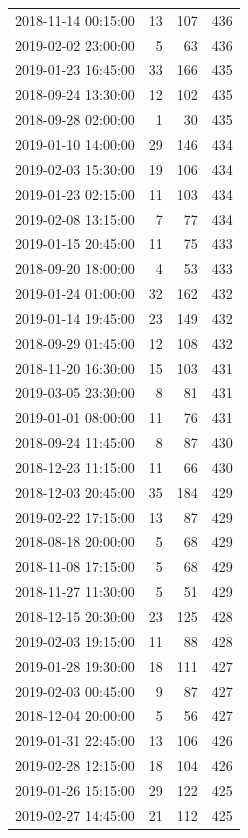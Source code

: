 \begin{tabular}{lrrr}
2018-11-14 00:15:00 & 13 & 107 & 436 \\
2019-02-02 23:00:00 & 5 & 63 & 436 \\
2019-01-23 16:45:00 & 33 & 166 & 435 \\
2018-09-24 13:30:00 & 12 & 102 & 435 \\
2018-09-28 02:00:00 & 1 & 30 & 435 \\
2019-01-10 14:00:00 & 29 & 146 & 434 \\
2019-02-03 15:30:00 & 19 & 106 & 434 \\
2019-01-23 02:15:00 & 11 & 103 & 434 \\
2019-02-08 13:15:00 & 7 & 77 & 434 \\
2019-01-15 20:45:00 & 11 & 75 & 433 \\
2018-09-20 18:00:00 & 4 & 53 & 433 \\
2019-01-24 01:00:00 & 32 & 162 & 432 \\
2019-01-14 19:45:00 & 23 & 149 & 432 \\
2018-09-29 01:45:00 & 12 & 108 & 432 \\
2018-11-20 16:30:00 & 15 & 103 & 431 \\
2019-03-05 23:30:00 & 8 & 81 & 431 \\
2019-01-01 08:00:00 & 11 & 76 & 431 \\
2018-09-24 11:45:00 & 8 & 87 & 430 \\
2018-12-23 11:15:00 & 11 & 66 & 430 \\
2018-12-03 20:45:00 & 35 & 184 & 429 \\
2019-02-22 17:15:00 & 13 & 87 & 429 \\
2018-08-18 20:00:00 & 5 & 68 & 429 \\
2018-11-08 17:15:00 & 5 & 68 & 429 \\
2018-11-27 11:30:00 & 5 & 51 & 429 \\
2018-12-15 20:30:00 & 23 & 125 & 428 \\
2019-02-03 19:15:00 & 11 & 88 & 428 \\
2019-01-28 19:30:00 & 18 & 111 & 427 \\
2019-02-03 00:45:00 & 9 & 87 & 427 \\
2018-12-04 20:00:00 & 5 & 56 & 427 \\
2019-01-31 22:45:00 & 13 & 106 & 426 \\
2019-02-28 12:15:00 & 18 & 104 & 426 \\
2019-01-26 15:15:00 & 29 & 122 & 425 \\
2019-02-27 14:45:00 & 21 & 112 & 425 \\

\end{tabular}
